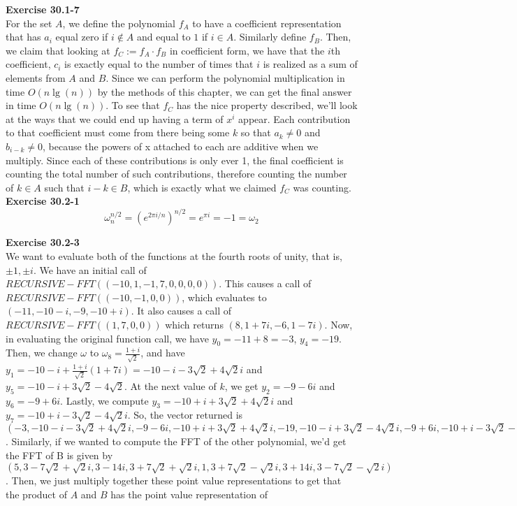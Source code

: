 \documentclass{article}
\begin{document}
\noindent\textbf{Exercise 30.1-7}\\
For the set $A$, we define the polynomial $f_A$ to have a coefficient representation that has $a_i$ equal zero if $i\not\in A$ and equal to $1$ if $i\in A$. Similarly define $f_B$. Then, we claim that looking at $f_C:=f_A \cdot f_B$ in coefficient form, we have that the $i$th coefficient, $c_i$ is exactly equal to the number of times that $i$ is realized as a sum of elements from $A$ and $B$. Since we can perform the polynomial multiplication in time $O(n\lg(n))$ by the methods of this chapter, we can get the final answer in time $O(n\lg(n))$. To see that $f_C$ has the nice property described, we'll look at the ways that we could end up having a term of $x^i$ appear. Each contribution to that coefficient must come from there being some $k$ so that $a_k \neq0$ and $b_{i-k}\neq 0$, because the powers of x attached to each are additive when we multiply. Since each of these contributions is only ever 1, the final coefficient is counting the total number of such contributions, therefore counting the number of $k\in A$ such that $i-k\in B$, which is exactly what we claimed $f_C$ was counting.\\

\noindent\textbf{Exercise 30.2-1}\\

\[
\omega_{n}^{n/2} = \left(e^{2\pi i/n} \right)^{n/2} = e^{\pi i} = -1 = \omega_2
\]


\noindent\textbf{Exercise 30.2-3}\\
We want to evaluate both of the functions at the fourth roots of unity, that is, $\pm1, \pm i$. We have an initial call of $RECURSIVE-FFT((-10,1,-1,7,0,0,0,0))$. This causes a call of $RECURSIVE-FFT((-10,-1,0,0))$, which evaluates to $(-11,-10-i,-9,-10+i)$. It also causes a call of $ RECURSIVE-FFT((1,7,0,0))$ which returns $(8,1+7i,-6,1-7i)$. Now, in evaluating the original function call, we have $y_0 = -11 +8 = -3$, $y_4 = -19$. Then, we change $\omega$ to $\omega_8 = \frac{1+i}{\sqrt{2}}$, and have $y_1 =-10-i + \frac{1+i}{\sqrt{2}}(1+7i) = -10 -i -3\sqrt{2} + 4\sqrt{2}i$ and $y_5 = -10 -i+ 3\sqrt{2} - 4\sqrt{2}$. At the next value of $k$, we get $y_2 =-9 -6i$ and $y_6 = -9 +6i$. Lastly, we compute $y_3 =-10+i+3\sqrt{2} +4\sqrt{2}i$ and $y_7 = -10+i-3\sqrt{2}-4\sqrt{2} i$. So, the vector returned is $(-3,-10-i-3\sqrt{2} +4\sqrt{2}i,-9-6i,-10+i+3\sqrt{2} +4\sqrt{2}i,-19,-10-i+3\sqrt{2}-4\sqrt{2}i,-9+6i,-10+i-3\sqrt{2}-4\sqrt{2} i)$. Similarly, if we wanted to compute the FFT of the other polynomial, we'd get the FFT of B is given by $(5,3-7\sqrt{2}+ \sqrt{2}i,3-14i,3+7\sqrt{2}+\sqrt{2}i,1,3+7\sqrt{2}-\sqrt{2}i,3+14i, 3-7\sqrt{2}-\sqrt{2}i)$. Then, we just multiply together these point value representations to get that the product of $A$ and $B$ has the point value representation of 
\end{document}
